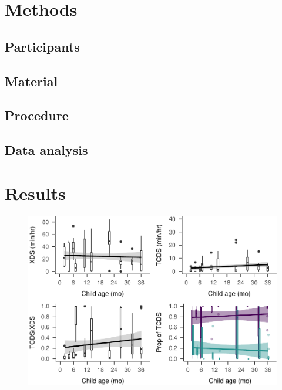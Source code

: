 \documentclass[man]{apa6}
\theoremstyle{definition}
\theoremstyle{definition}
\theoremstyle{definition}
\theoremstyle{remark}
\begin{document}
\section{Methods}\label{methods}

\subsection{Participants}\label{participants}

\subsection{Material}\label{material}

\subsection{Procedure}\label{procedure}

\subsection{Data analysis}\label{data-analysis}

\section{Results}\label{results}

\begin{figure}
\centering
\includegraphics{Tseltal-CLE_files/figure-latex/plot_XDS_TDS_quantity_random-1.pdf}
\caption{}
\end{figure}
\end{document}
